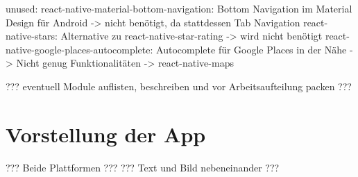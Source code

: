unused:
react-native-material-bottom-navigation: Bottom Navigation im Material Design für Android -> nicht benötigt, da stattdessen Tab Navigation
react-native-stars: Alternative zu react-native-star-rating -> wird nicht benötigt
react-native-google-places-autocomplete: Autocomplete für Google Places in der Nähe -> Nicht genug Funktionalitäten -> react-native-maps

??? eventuell Module auflisten, beschreiben und vor Arbeitsaufteilung packen ???






\section{Vorstellung der App}
??? Beide Plattformen ???
??? Text und Bild nebeneinander ???

